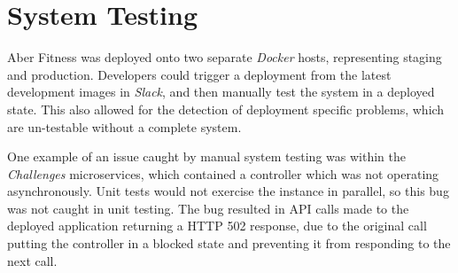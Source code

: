 \section{System Testing}
\par
Aber Fitness was deployed onto two separate \textit{Docker} hosts, representing staging and production. Developers could trigger a deployment from the latest development images in \textit{Slack}, and then manually test the system in a deployed state. This also allowed for the detection of deployment specific problems, which are un-testable without a complete system.

\par
One example of an issue caught by manual system testing was within the \textit{Challenges} microservices, which contained a controller which was not operating asynchronously. Unit tests would not exercise the instance in parallel, so this bug was not caught in unit testing. The bug resulted in API calls made to the deployed application returning a HTTP 502 response, due to the original call putting the controller in a blocked state and preventing it from responding to the next call.
